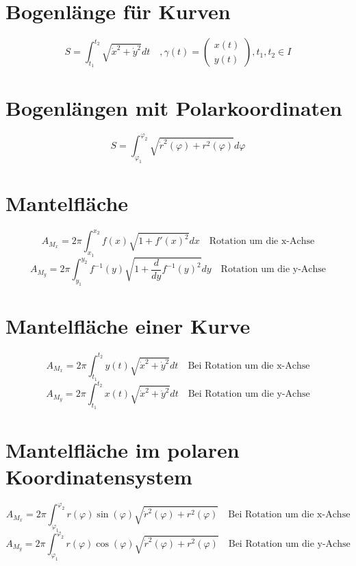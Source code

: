 \section{Bogenlänge für Kurven}
\[ \boxed{S = \int_{t_1}^{t_2}\sqrt{\dot{x}^2 + \dot{y}^2} dt \quad ,\gamma(t) = \left(\begin{matrix}x(t)\\y(t)\end{matrix}\right), t_1, t_2 \in I} \]

\section{Bogenlängen mit Polarkoordinaten}
\[ \boxed{S = \int_{\varphi_1}^{\varphi_2}\sqrt{\dot{r}^2(\varphi) + r^2(\varphi)}d\varphi} \]

\section{Mantelfläche}
\[ \boxed{A_{M_x} = 2 \pi \int_{x_1}^{x_2}f(x) \sqrt{1 + f'(x)^2} dx} \quad \text{Rotation um die x-Achse} \]
\[ \boxed{A_{M_y} = 2 \pi \int_{y_1}^{y_2}f^{-1}(y) \sqrt{1 + \frac{d}{dy}f^{-1}(y)^2} dy} \quad \text{Rotation um die y-Achse} \]

\section{Mantelfläche einer Kurve}
\[ \boxed{A_{M_x} = 2 \pi \int_{t_1}^{t_2} y(t) \sqrt{\dot{x}^2 + \dot{y}^2}dt} \quad \text{Bei Rotation um die x-Achse} \]
\[ \boxed{A_{M_y} = 2 \pi \int_{t_1}^{t_2} x(t) \sqrt{\dot{x}^2 + \dot{y}^2}dt} \quad \text{Bei Rotation um die y-Achse} \]

\section{Mantelfläche im polaren Koordinatensystem}
\[ \boxed{A_{M_x} = 2 \pi \int_{\varphi_1}^{\varphi_2}r(\varphi) \sin(\varphi)\sqrt{\dot{r}^2(\varphi) + r^2(\varphi)}} \quad \text{Bei Rotation um die x-Achse} \]
\[ \boxed{A_{M_y} = 2 \pi \int_{\varphi_1}^{\varphi_2}r(\varphi) \cos(\varphi)\sqrt{\dot{r}^2(\varphi) + r^2(\varphi)}} \quad \text{Bei Rotation um die y-Achse} \]
